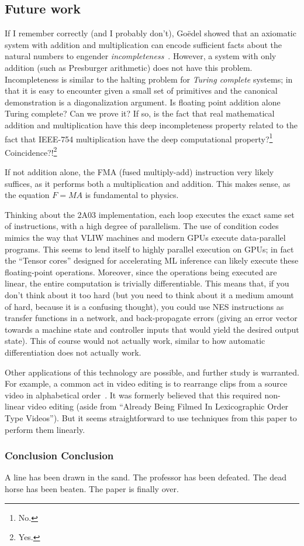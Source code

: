 \documentclass[twocolumn]{article}
\begin{document}
\subsection{Future work}

If I remember correctly (and I probably don't), Go\"edel showed that
an axiomatic system with addition and multiplication can encode
sufficient facts about the natural numbers to engender {\it
  incompleteness}~\cite{goedel1930incompleteness}. However, a system
with only addition (such as Presburger arithmetic) does not have this
problem. Incompleteness is similar to the halting problem for {\it
  Turing complete} systems; in that it is easy to encounter given a
small set of primitives and the canonical demonstration is a
diagonalization argument. Is floating point addition alone Turing
complete? Can we prove it? If so, is the fact that real mathematical
addition and multiplication have this deep incompleteness property
related to the fact that IEEE-754 multiplication have the deep
computational property?\footnote{No.} Coincidence?!\footnote{Yes.}

If not addition alone, the FMA (fused multiply-add) instruction very
likely suffices, as it performs both a multiplication and addition.
This makes sense, as the equation $F = MA$ is fundamental to physics.

Thinking about the 2A03 implementation, each loop executes the exact
same set of instructions, with a high degree of parallelism. The use
of condition codes mimics the way that VLIW machines and modern GPUs
execute data-parallel programs. This seems to lend itself to highly
parallel execution on GPUs; in fact the ``Tensor cores'' designed for
accelerating ML inference can likely execute these floating-point
operations. Moreover, since the operations being executed are linear,
the entire computation is trivially differentiable. This means that,
if you don't think about it too hard (but you need to think about it a
medium amount of hard, because it is a confusing thought), you could
use NES instructions as transfer functions in a network, and
back-propagate errors (giving an error vector towards a machine state
and controller inputs that would yield the desired output state). This
of course would not actually work, similar to how automatic
differentiation does not actually work.

Other applications of this technology are possible, and further study
is warranted. For example, a common act in video editing is to
rearrange clips from a source video in alphabetical
order~\cite{murphy2014arst}. It was formerly believed that this
required non-linear video editing (aside from ``Already Being Filmed
In Lexicographic Order Type Videos''). But it seems straightforward to
use techniques from this paper to perform them linearly.

\subsubsection{Conclusion Conclusion}
A line has been drawn in the sand. The professor has been defeated. The dead horse has been beaten.
The paper is finally over.

{}

\end{document}
